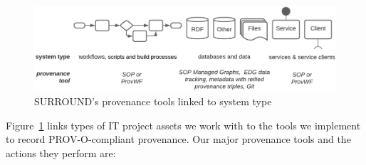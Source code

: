 \documentclass[letterpaper,twocolumn,10pt]{article}
\begin{document}
\begin{figure}
  \begin{center}
    \includegraphics[width=\textwidth]{images/overview.png}
  \end{center}
  \caption{\label{fig:overview} SURROUND's provenance tools linked to system type}
  \end{figure}

Figure~\ref{fig:overview} links types of IT project assets we work with to the tools we implement
to record PROV-O-compliant provenance. Our major provenance tools and the actions they perform are:
\end{document}
